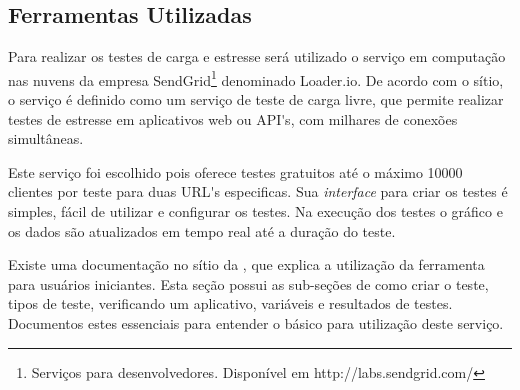 





\subsection{Ferramentas Utilizadas}
\label{ferramentas-utilizadas-para-testes}
  
  Para realizar os testes de carga e estresse será utilizado o serviço em computação nas nuvens
  da empresa SendGrid\footnote[8]{Serviços para desenvolvedores. Disponível em http://labs.sendgrid.com/} denominado Loader.io.
  De acordo com o sítio, o serviço é definido como um serviço de teste de carga livre,
  que permite realizar testes de estresse em aplicativos web ou API\'{}s, com milhares de conexões simultâneas.
  
  Este serviço foi escolhido pois oferece testes gratuitos até o máximo 10000 clientes por teste para duas 
  URL\'{}s especificas. Sua \textit{interface} para criar os testes é simples, fácil de utilizar e
  configurar os testes. Na execução dos testes o gráfico e os dados são atualizados em tempo real até a duração do teste.
  
  Existe uma documentação no sítio da , que explica a utilização da ferramenta para usuários
  iniciantes. Esta seção possui as sub-seções de como criar o teste, tipos de teste,
  verificando um aplicativo, variáveis e resultados de testes. Documentos estes essenciais para 
  entender o básico para utilização deste serviço. 
  